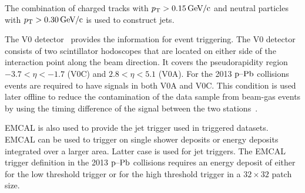 The combination of charged tracks with  $\pt{} > \unit[0.15]{\GeVc}$ and neutral particles with $\pt{} > \unit[0.30]{\GeVc}$ is used to construct jets. 

The V0 detector~\cite{forwarddetectorsTdr} provides the information for event triggering. The V0 detector consists of two scintillator hodoscopes that are located on either side of the interaction point along the beam direction. It covers the pseudorapidity region $-3.7 < \eta < -1.7$ (V0C) and $2.8 < \eta < 5.1$ (V0A). For the 2013 $\mbox{p--Pb}$ collisions events are required to have signals in both V0A and V0C. This condition is used later offline to reduce the contamination of the data sample from beam-gas events by using the timing difference of the signal between the two stations~\cite{alicePerformance}.


EMCAL is also used to provide the jet trigger used in triggered datasets. EMCAL can be used to trigger on single shower deposits or energy deposits integrated over a larger area. Latter case is used for jet triggers. The EMCAL trigger definition in the 2013 $\mbox{p--Pb}$ collisions requires an energy deposit of either \unit[10]{\gev}  for the low threshold trigger or \unit[20]{\gev} for the high threshold trigger in a $32\times32$ patch size.


